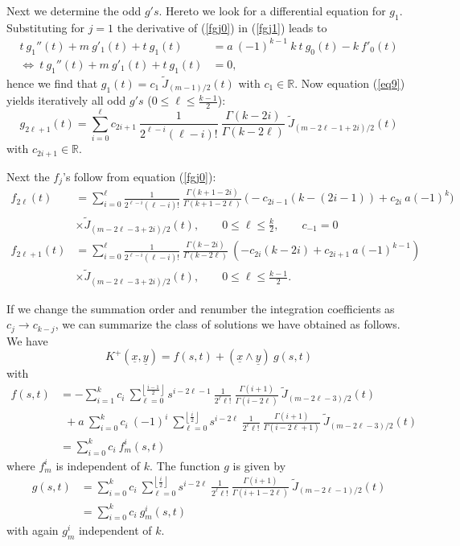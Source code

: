 \documentclass{amsart}
\theoremstyle{remark}
\begin{document}
Next we determine the odd $g's$. Hereto we look for a differential equation for $g_1$. Substituting for $j=1$ the derivative of (\ref{fgj0}) in (\ref{fgj1}) leads to
\begin{align*}
t \ g_1''(t) + m \ g'_1(t) + t \ g_1(t) & = a \ (-1)^{k-1} \ k \ t \ g_0(t) - k \ f'_0(t)\\
\Leftrightarrow \  t \ g_1''(t) + m \ g'_1(t) + t \ g_1(t) & = 0,
\end{align*}
hence we find that $g_1(t) = c_1 \ \widetilde{J}_{(m-1)/2}(t)$ with $c_1 \in \mathbb{R}$. Now equation (\ref{eq9}) yields iteratively all odd $g's$ ($0 \leq \ell \leq \frac{k-1}{2}$):
\begin{displaymath}
g_{2 \ell+1}(t) = \sum_{i=0}^{\ell} c_{2i+1} \ \frac{1}{2^{\ell-i} (\ell-i)!} \ \frac{\Gamma(k-2i)}{\Gamma(k-2\ell)} \  \widetilde{J}_{(m-2\ell-1+2i)/2}(t) 
\end{displaymath}
with $c_{2i+1} \in \mathbb{R}$.

Next the $f_j$'s follow from equation (\ref{fgj0}):
\begin{align*}
f_{2 \ell}(t)  &= \sum_{i=0}^{\ell}  \frac{1}{2^{\ell-i} (\ell-i)!} \ \frac{\Gamma(k+1-2i)}{\Gamma(k+1-2\ell)} \ \biggl( -c_{2i-1} (k-(2i-1)) + c_{2i} \ a  (-1)^k \biggr)\\
& \times \widetilde{J}_{(m-2\ell-3+2i)/2}(t), \qquad 0 \leq \ell \leq \frac{k}{2}, \qquad c_{-1} = 0\\
f_{2 \ell+1}(t)  &= \sum_{i=0}^{\ell}  \frac{1}{2^{\ell-i} (\ell-i)!} \ \frac{\Gamma(k-2i)}{\Gamma(k-2\ell)} \ \left( -c_{2i} (k-2i) + c_{2i+1} \ a  (-1)^{k-1} \right)\\
& \times  \widetilde{J}_{(m-2\ell-3+2i)/2}(t), \qquad 0 \leq \ell \leq \frac{k-1}{2}. 
\end{align*}   

If we change the summation order and renumber the integration coefficients as $c_{j} \rightarrow c_{k-j}$, we can summarize the class of solutions we have obtained as follows. We have
\[
K^+({\underline{x}},{\underline{y}})  =  f(s,t) + ({\underline{x}} \wedge {\underline{y}}) \ g(s,t)
\]
with
\begin{align*}
f(s,t) &=  - \sum_{i = 1}^{k} c_{i} \  \sum_{\ell =0}^{\left\lfloor  \frac{i-1}{2} \right\rfloor} s^{i-2 \ell-1} \ \frac{1}{2^{\ell} \ell!} \ \frac{\Gamma(i+1)}{\Gamma(i-2\ell)} \ \widetilde{J}_{(m-2\ell-3)/2}(t)\\
& \ \ + a \ \sum_{i=0}^k c_i \ (-1)^i \ \sum_{\ell =0}^{\left\lfloor  \frac{i}{2}\right\rfloor} s^{i-2\ell} \ \frac{1}{2^{\ell} \ell!} \ \frac{\Gamma(i+1)}{\Gamma(i-2\ell+1)} \ \widetilde{J}_{(m-2\ell-3)/2}(t)\\
&= \sum_{i=0}^{k} c_i \ f_m^i(s,t)
\end{align*} 
where $f_m^i$ is independent of $k$. The function $g$ is given by
\begin{align*}
g(s,t) &=  \sum_{i=0}^k c_i \ \sum_{\ell=0}^{\left\lfloor  \frac{i}{2} \right\rfloor} s^{i-2\ell} \ \frac{1}{2^{\ell} \ell!} \ \frac{\Gamma(i+1)}{\Gamma(i+1-2\ell)} \ \widetilde{J}_{(m-2\ell-1)/2}(t)\\
&=  \sum_{i=0}^{k} c_i \ g_m^i(s,t)
\end{align*}
with again $g_m^i$ independent of $k$.
\end{document}
